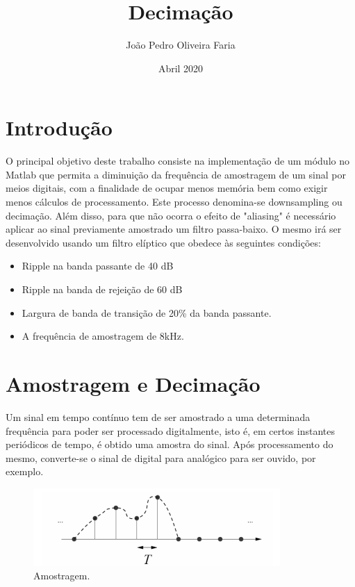 \documentclass{article}
\title{Decimação}
\author{João Pedro Oliveira Faria}
\date{Abril 2020}
\begin{document}
\begin{titlepage}
\clearpage\maketitle
\thispagestyle{empty}
\end{titlepage}

\tableofcontents

\section{Introdução}

    O principal objetivo deste trabalho consiste na implementação de um módulo no Matlab que permita a diminuição da frequência de amostragem de um sinal por meios digitais, com a finalidade de ocupar menos memória bem como exigir menos cálculos de processamento. Este processo denomina-se downsampling ou decimação.
    Além disso, para que não ocorra o efeito de "aliasing" é necessário aplicar ao sinal previamente amostrado um filtro passa-baixo. O mesmo irá ser desenvolvido usando um filtro elíptico que obedece às seguintes condições:
    
    \raggedright
    \vspace{5mm} %
    \begin{itemize}
    \item{Ripple na banda passante de 40 dB}
    \item{Ripple na banda de rejeição de 60 dB}
    \item{Largura de banda de transição de 20\% da banda passante.}
    \item{A frequência de amostragem de 8kHz.}
    \end{itemize}
    
\section{Amostragem e Decimação}

    Um sinal em tempo contínuo tem de ser amostrado a uma determinada frequência para poder ser processado digitalmente, isto é, em certos instantes periódicos de tempo, é obtido uma amostra do sinal. Após processamento do mesmo, converte-se o sinal de digital para analógico para ser ouvido, por exemplo.\\ 

\begin{figure}[h!]
\centering
\includegraphics[scale=0.5]{matlab_test_images/outras_imgs/sampling.PNG}
\caption{Amostragem.}
\label{fig:matlab_test_images/outras_imgs/sampling}
\end{figure}
    
\end{document}
